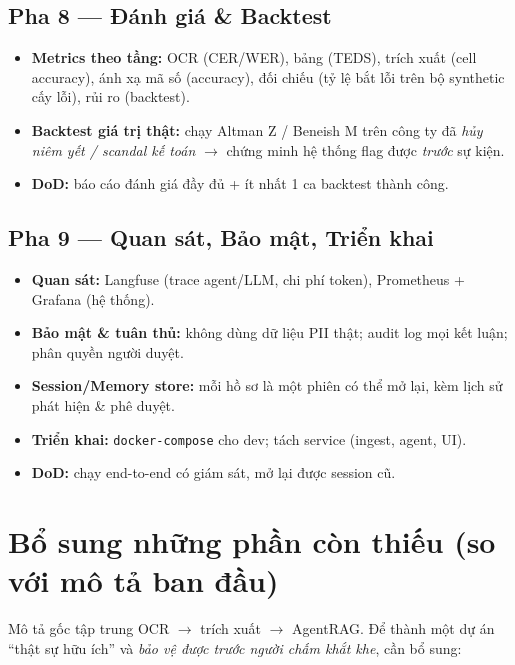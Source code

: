 \documentclass[11pt,a4paper]{article}
\newcommand{\pha}[1]{\subsection{#1}}
\begin{document}
\pha{Pha 8 --- Đánh giá \& Backtest}
\begin{itemize}
  \item \textbf{Metrics theo tầng:} OCR (CER/WER), bảng (TEDS), trích xuất (cell accuracy), ánh xạ mã số (accuracy), đối chiếu (tỷ lệ bắt lỗi trên bộ synthetic cấy lỗi), rủi ro (backtest).
  \item \textbf{Backtest giá trị thật:} chạy Altman Z / Beneish M trên công ty đã \emph{hủy niêm yết / scandal kế toán} $\rightarrow$ chứng minh hệ thống flag được \emph{trước} sự kiện.
  \item \textbf{DoD:} báo cáo đánh giá đầy đủ + ít nhất 1 ca backtest thành công.
\end{itemize}

\pha{Pha 9 --- Quan sát, Bảo mật, Triển khai}
\begin{itemize}
  \item \textbf{Quan sát:} Langfuse (trace agent/LLM, chi phí token), Prometheus + Grafana (hệ thống).
  \item \textbf{Bảo mật \& tuân thủ:} không dùng dữ liệu PII thật; audit log mọi kết luận; phân quyền người duyệt.
  \item \textbf{Session/Memory store:} mỗi hồ sơ là một phiên có thể mở lại, kèm lịch sử phát hiện \& phê duyệt.
  \item \textbf{Triển khai:} \texttt{docker-compose} cho dev; tách service (ingest, agent, UI).
  \item \textbf{DoD:} chạy end-to-end có giám sát, mở lại được session cũ.
\end{itemize}

\section{Bổ sung những phần còn thiếu (so với mô tả ban đầu)}

Mô tả gốc tập trung OCR $\rightarrow$ trích xuất $\rightarrow$ AgentRAG. Để thành một dự án ``thật sự hữu ích'' và \emph{bảo vệ được trước người chấm khắt khe}, cần bổ sung:
\end{document}
